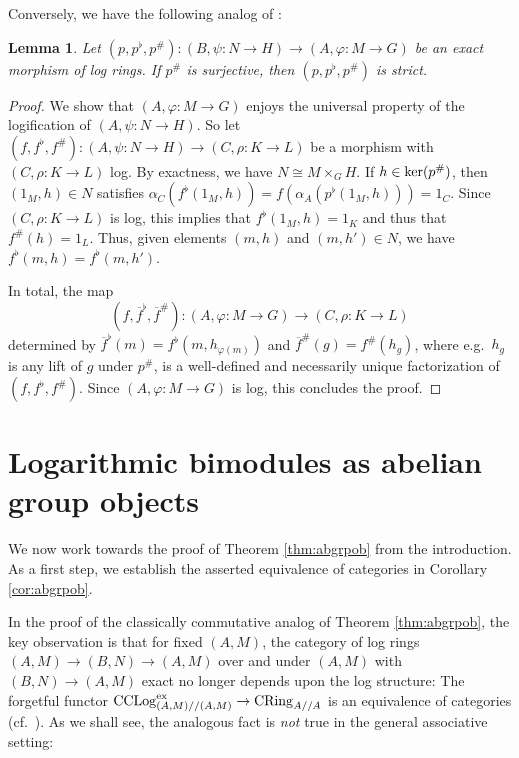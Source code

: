 \documentclass[a4paper,10pt%
]{amsart}
\numberwithin{equation}{section}
\newtheorem{lemma}[subsection]{Lemma}
\theoremstyle{definition}
\renewcommand{\:}{\colon}
\begin{document}
\noindent Conversely, we have the following analog of \cite[Proposition I.4.2.1(5)]{Ogu18}:

\begin{lemma}\label{lem:exstrict} Let $(p, p^\flat, p^\#) \colon (B, \psi \colon N \to H) \to (A, \varphi \colon M \to G)$ be an exact morphism of log rings. If $p^\#$ is surjective, then $(p, p^\flat, p^\#)$ is strict. 
\end{lemma}

\begin{proof} We show that $(A, \varphi \colon M \to G)$ enjoys the universal property of the logification of $(A, \psi \colon N \to H)$. So let $(f, f^\flat, f^\#) \colon (A, \psi \colon N \to H) \to (C, \rho \colon K \to L)$ be a morphism with $(C, \rho \colon K \to L)$ log. By exactness, we have $N \cong M \times_G H$. If $h \in {\rm ker}(p^\#)$, then $(1_M, h) \in N$ satisfies $\alpha_C(f^\flat(1_M, h)) = f(\alpha_A(p^\flat(1_M, h))) = 1_C$. Since $(C, \rho \colon K \to L)$ is log, this implies that $f^\flat(1_M, h) = 1_K$ and thus that $f^\#(h) = 1_L$. Thus, given elements $(m, h)$ and $(m, h') \in N$, we have $f^\flat(m, h) = f^\flat(m, h')$. 

In total, the map \[(f, \overline{f}^\flat, \overline{f}^\#) \colon (A, \varphi \colon M \to G) \to (C, \rho \colon K \to L)\] determined by $\overline{f}^\flat(m) = f^\flat(m, h_{\varphi(m)})$ and $ \overline{f}^\#(g) = f^\#(h_g)$, where e.g.\ $h_g$ is any lift of $g$ under $p^\#$, is a well-defined and necessarily unique factorization of $(f, f^\flat, f^\#)$. Since $(A, \varphi \colon M \to G)$ is log, this concludes the proof. 
\end{proof}


\section{Logarithmic bimodules as abelian group objects}\label{sec:abgrp}

We now work towards the proof of Theorem \ref{thm:abgrpob} from the introduction. As a first step, we establish the asserted equivalence of categories in Corollary \ref{cor:abgrpob}.

In the proof of the classically commutative analog of Theorem \ref{thm:abgrpob}, the key observation is that for fixed $(A, M)$, the category of log rings $(A, M) \to (B, N) \to (A, M)$ over and under $(A, M)$ with $(B, N) \to (A, M)$ exact no longer depends upon the log structure: The forgetful functor ${\rm CCLog}^{\rm ex}_{(A, M) // (A, M)} \to {\rm CRing}_{A // A}$ is an equivalence of categories (cf.\ \cite[Corollary 2.14]{Lun25}). As we shall see, the analogous fact is \emph{not} true in the general associative setting:
\end{document}
